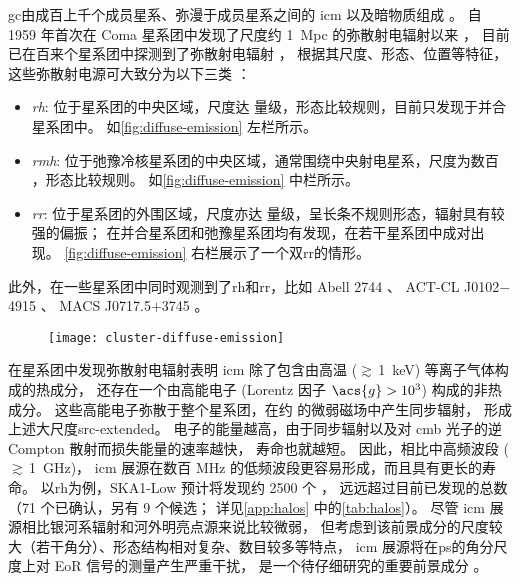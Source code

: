 \ac{gc}由成百上千个成员星系、弥漫于成员星系之间的 \ac{icm} 以及暗物质组成
\cite{sarazin1986,bohringer2010}。
自 1959 年首次在 Coma 星系团中发现了尺度约 \SI{1}{Mpc} 的弥散射电辐射以来
\cite{large1959}，
目前已在百来个星系团中探测到了弥散射电辐射 \cite{feretti2012,vanWeeren2019}，
根据其尺度、形态、位置等特征，这些弥散射电源可大致分为以下三类
\cite{feretti2012,kale2016}：
\begin{itemize}
  \item \emph{\acf{rh}}:
    位于星系团的中央区域，尺度达 \si{\Mpc} 量级，形态比较规则，目前只发现于并合星系团中。
    如\autoref{fig:diffuse-emission} 左栏所示。
  \item \emph{\acf{rmh}}:
    位于弛豫冷核星系团的中央区域，通常围绕中央射电星系，尺度为数百 \si{\kpc}，形态比较规则。
    如\autoref{fig:diffuse-emission} 中栏所示。
  \item \emph{\acf{rr}}:
    位于星系团的外围区域，尺度亦达 \si{\Mpc} 量级，呈长条不规则形态，辐射具有较强的偏振；
    在并合星系团和弛豫星系团均有发现，在若干星系团中成对出现。
    \autoref{fig:diffuse-emission} 右栏展示了一个双\ac{rr}的情形。
\end{itemize}
此外，在一些星系团中同时观测到了\ac{rh}和\ac{rr}，比如
Abell 2744 \cite{govoni2001}、
ACT-CL J0102$-$4915 \cite{lindner2014}、
MACS J0717.5$+$3745 \cite{vanWeeren2009}。

\begin{figure}[htp]
  \centering
  \texttt{[image: cluster-diffuse-emission]}
  \label{fig:diffuse-emission}
\end{figure}

在星系团中发现弥散射电辐射表明
\ac{icm} 除了包含由高温 ($\gtrsim$\,\SI{1}{\keV}) 等离子气体构成的热成分，
还存在一个由高能电子 (Lorentz 因子 $\acs{g} > \num{e3}$) 构成的非热成分。
这些高能电子弥散于整个星系团，在约 \si{\uG} 的微弱磁场中产生同步辐射，
形成上述大尺度\ac{src-extended}。
电子的能量越高，由于同步辐射以及对 \ac{cmb} 光子的逆 Compton 散射而损失能量的速率越快，
寿命也就越短。
因此，相比中高频波段 ($\gtrsim$\,\SI{1}{\GHz})，
\ac{icm} 展源在数百 MHz 的低频波段更容易形成，而且具有更长的寿命。
以\ac{rh}为例，SKA1-Low 预计将发现约 2500 个 \cite{cassano2015}，
远远超过目前已发现的总数（71 个已确认，另有 9 个候选；
详见\autoref{app:halos} 中的\autoref{tab:halos}）。
尽管 \ac{icm} 展源相比银河系辐射和河外明亮点源来说比较微弱，
但考虑到该前景成分的尺度较大（若干角分）、形态结构相对复杂、数目较多等特点，
\ac{icm} 展源将在\ac{ps}的角分尺度上对 EoR 信号的测量产生严重干扰，
是一个待仔细研究的重要前景成分 \cite{diMatteo2004,gleser2008}。

